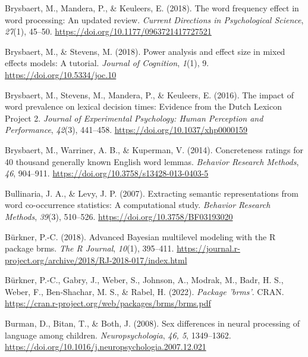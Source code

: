 \documentclass[
  12pt,
  man,floatsintext]{apa7}
\newlength{\cslhangindent}
\newlength{\cslentryspacingunit} %
\newenvironment{CSLReferences}[2] %
 {%
  \setlength{\parindent}{0pt}
  \ifodd #1
  \let\oldpar\par
  \def\par{\hangindent=\cslhangindent\oldpar}
  \fi
  \setlength{\parskip}{#2\cslentryspacingunit}
 }%
 {}
\begin{document}
\begin{CSLReferences}{1}{0}
\leavevmode{}%
Brysbaert, M., Mandera, P., \& Keuleers, E. (2018). The word frequency effect in word processing: {An} updated review. \emph{Current Directions in Psychological Science}, \emph{27}(1), 45--50. \url{https://doi.org/10.1177/0963721417727521}

\leavevmode{}%
Brysbaert, M., \& Stevens, M. (2018). Power analysis and effect size in mixed effects models: A tutorial. \emph{Journal of Cognition}, \emph{1}(1), 9. \url{https://doi.org/10.5334/joc.10}

\leavevmode{}%
Brysbaert, M., Stevens, M., Mandera, P., \& Keuleers, E. (2016). The impact of word prevalence on lexical decision times: {Evidence} from the {Dutch Lexicon Project} 2. \emph{Journal of Experimental Psychology: Human Perception and Performance}, \emph{42}(3), 441--458. \url{https://doi.org/10.1037/xhp0000159}

\leavevmode{}%
Brysbaert, M., Warriner, A. B., \& Kuperman, V. (2014). Concreteness ratings for 40 thousand generally known {English} word lemmas. \emph{Behavior Research Methods}, \emph{46}, 904--911. \url{https://doi.org/10.3758/s13428-013-0403-5}

\leavevmode{}%
Bullinaria, J. A., \& Levy, J. P. (2007). Extracting semantic representations from word co-occurrence statistics: {A} computational study. \emph{Behavior Research Methods}, \emph{39}(3), 510--526. \url{https://doi.org/10.3758/BF03193020}

\leavevmode{}%
Bürkner, P.-C. (2018). Advanced {Bayesian} multilevel modeling with the {R} package {brms}. \emph{The R Journal}, \emph{10}(1), 395--411. \url{https://journal.r-project.org/archive/2018/RJ-2018-017/index.html}

\leavevmode{}%
Bürkner, P.-C., Gabry, J., Weber, S., Johnson, A., Modrak, M., Badr, H. S., Weber, F., Ben-Shachar, M. S., \& Rabel, H. (2022). \emph{Package '{brms}'}. {CRAN}. \url{https://cran.r-project.org/web/packages/brms/brms.pdf}

\leavevmode{}%
Burman, D., Bitan, T., \& Both, J. (2008). Sex differences in neural processing of language among children. \emph{Neuropsychologia}, \emph{46, 5}, 1349--1362. \url{https://doi.org/10.1016/j.neuropsychologia.2007.12.021}


\end{CSLReferences}
\end{document}
